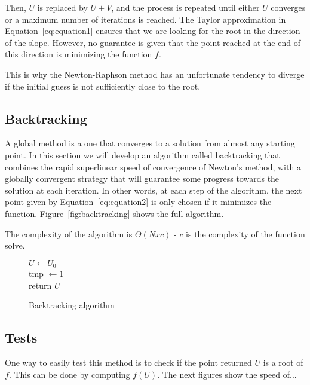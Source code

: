 Then, $U$ is replaced by $U+V$, and the process is repeated until either $U$ converges or a maximum number of iterations is reached. The Taylor approximation in Equation~\vref{eq:equation1} ensures that we are looking for the root in the direction of the slope. However, no guarantee is given that the point reached at the end of this direction is minimizing the function $f$.

This is why the Newton-Raphson method has an unfortunate tendency to diverge if the initial guess is not sufficiently close to the root.   

\subsection{Backtracking}
A global method is a one that converges to a solution from almost any starting point. In this section we will develop an algorithm called backtracking that combines the rapid superlinear speed of convergence of Newton's method, with a globally convergent strategy that will guarantee some progress towards the solution at each iteration. In other words, at each step of the algorithm, the next point given by Equation~\vref{eq:equation2} is only chosen if it minimizes the function. Figure~\vref{fig:backtracking} shows the full algorithm.

The complexity of the algorithm is $\Theta(N x c)$ - $c$ is the complexity of the function solve.

\begin{figure}[ht]
  \centering
  \begin{algorithm}[H]
    $U \leftarrow U_0$\\
    tmp $\leftarrow 1$\\
    return $U$\\
  \end{algorithm}
  \caption{Backtracking algorithm}
  \label{fig:backtracking}
\end{figure}
 
\subsection{Tests}
One way to easily test this method is to check if the point returned $U$ is a root of $f$. This can be done by computing $f(U)$. The next figures show the speed of...
